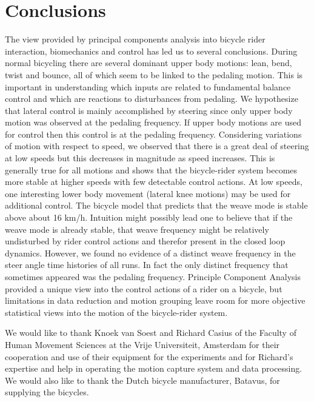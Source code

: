 \section{Conclusions}
\label{sec:conclusions}
The view provided by principal components analysis into bicycle rider
interaction, biomechanics and control has led us to several conclusions. During
normal bicycling there are several dominant upper body motions: lean, bend, twist and
bounce, all of which seem to be linked to the pedaling motion. This is important in
understanding which inputs are related to fundamental balance
control and which are reactions to disturbances from pedaling. We hypothesize
that lateral control is mainly accomplished by steering
since only upper body motion was observed at the pedaling frequency. If
upper body motions are used for control then this control is at the pedaling
frequency. Considering variations of motion with respect to speed, we observed that there is
a great deal of steering at low speeds but this decreases in magnitude as speed
increases. This is generally true for all motions and shows that the
bicycle-rider system becomes more stable at higher speeds with few
detectable control actions. At low speeds, one interesting lower body movement
(lateral knee motions) may be used for
additional control. The bicycle model that predicts that the weave
mode is stable above about 16 km/h. Intuition might possibly lead one to believe
that if the weave mode is already stable, that weave frequency might be
relatively undisturbed by rider control actions and therefor present in the
closed loop dynamics. However, we found no evidence of a distinct
weave frequency in the steer angle time histories of all runs. In fact the only
distinct frequency that sometimes appeared was the pedaling frequency.
Principle Component Analysis provided a unique view
into the control actions of a rider on a bicycle, but limitations in data
reduction and motion grouping leave room for more objective statistical
views into the motion of the bicycle-rider system.
\begin{acknowledgements}
We would like to thank Knoek van Soest and Richard Casius of the Faculty of
Human Movement Sciences at the Vrije Universiteit, Amsterdam for their cooperation and use
of their equipment for the experiments and for Richard's expertise and help in
operating the motion capture system and data processing. We would also like to
thank the Dutch bicycle manufacturer, Batavus, for supplying the bicycles.
\end{acknowledgements}

